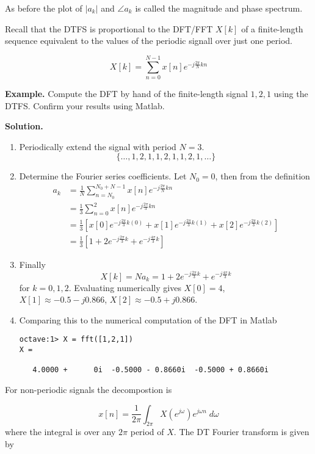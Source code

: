 \documentclass{article}
\begin{document}
As before the plot of $|a_k|$ and $\angle a_k$ is called the magnitude and phase spectrum.

Recall that the DTFS is proportional to the DFT/FFT $X[k]$ of a finite-length sequence equivalent to the values of the periodic signall over just one period.

\[
X[k] = \sum\limits_{n = 0}^{N-1} x[n]e^{-j\frac{2\pi}{N} k n }
\]

\textbf{Example.} Compute the DFT by hand of the finite-length signal ${1,2,1}$ using the DTFS. Confirm your results using Matlab.

\textbf{Solution.}
\begin{enumerate}
\item Periodically extend the signal with period $N = 3$.
  \[
  \{ \ldots, 1, 2, 1, 1, 2, 1, 1, 2, 1, \ldots \}
  \]
\item Determine the Fourier series coefficients. Let $N_0= 0$, then from the definition 
  \begin{align}
    a_k &= \frac{1}{N} \sum\limits_{n = N_0}^{N_0+N-1} x[n]e^{-j\frac{2\pi}{N} k n }\\
    &= \frac{1}{3} \sum\limits_{n = 0}^{2} x[n]e^{-j\frac{2\pi}{3} k n }\\
    &= \frac{1}{3}\left[ x[0]e^{-j\frac{2\pi}{3} k (0)} + x[1]e^{-j\frac{2\pi}{3} k (1)} + x[2]e^{-j\frac{2\pi}{3} k (2)}\right]\\
    &= \frac{1}{3}\left[ 1 + 2e^{-j\frac{2\pi}{3} k} + e^{-j\frac{4\pi}{3} k}\right]
  \end{align}

\item Finally
  \[
  X[k] = N a_k = 1 + 2e^{-j\frac{2\pi}{3} k} + e^{-j\frac{4\pi}{3} k}
  \]
  for $k = 0,1,2$. Evaluating numerically gives $X[0] = 4$, $X[1] \approx -0.5 - j0.866$, $X[2] \approx -0.5 + j0.866$.
  
\item Comparing this to the numerical computation of the DFT in Matlab
\begin{verbatim}
octave:1> X = fft([1,2,1])
X =

   4.0000 +      0i  -0.5000 - 0.8660i  -0.5000 + 0.8660i
\end{verbatim}
\end{enumerate}

For non-periodic signals the decompostion is

\[
x[n] = \frac{1}{2\pi} \int_{2\pi} X\left(e^{j\omega}\right) e^{j\omega n} \; d\omega
\]
where the integral is over any $2\pi$ period of $X$. The DT Fourier transform is given by
\end{document}
